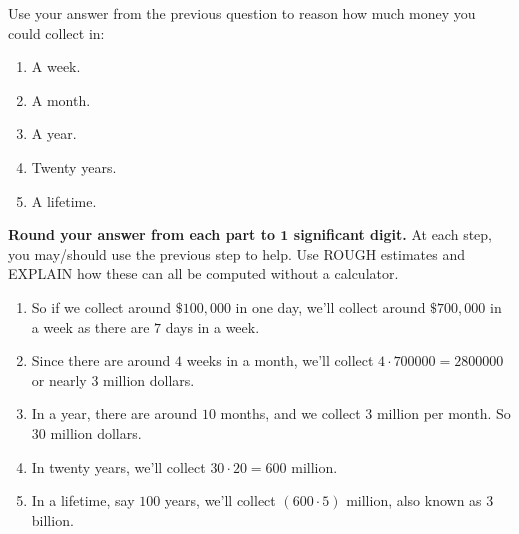 \documentclass[nooutcomes,noauthor,hints]{ximera}
\begin{document}
\begin{question}
  Use your answer from the previous question to reason how much money
  you could collect in:
  \begin{enumerate}
  \item A week.
  \item A month.
  \item A year.
  \item Twenty years.
  \item A lifetime.
  \end{enumerate}
  \textbf{Round your answer from each part to $\boldsymbol{1}$ significant digit.}
  At each step, you may/should use the previous step to help. Use
  ROUGH estimates and EXPLAIN how these can all be computed without a
  calculator.
  \begin{freeResponse}
    \begin{enumerate}
      \item So if we collect around $\$100,000$ in one day, we'll
        collect around $\$700,000$ in a week as there are $7$ days in
        a week.
      \item Since there are around $4$ weeks in a month, we'll collect
        $4\cdot 700000 = 2800000$ or nearly $3$ million dollars.
      \item In a year, there are around $10$ months, and we collect
        $3$ million per month. So $30$ million dollars.
      \item In twenty years, we'll collect $30\cdot 20 = 600$ million.
      \item In a lifetime, say $100$ years, we'll collect $(600\cdot 5)$
        million, also known as $3$ billion.
    \end{enumerate}
  \end{freeResponse}
\end{question}
\mynewpage
\end{document}
